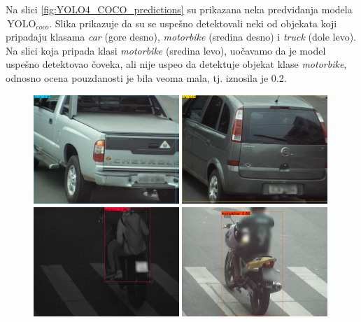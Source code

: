 \documentclass[12pt,oneside]{memoir}
\newcommand{\yolo}{\ensuremath{\,\textrm{YOLO}}}
\begin{document}
Na slici \ref{fig:YOLO4_COCO_predictions} su prikazana neka predviđanja modela $\yolo_{coco}$. Slika prikazuje da su se uspešno detektovali neki od objekata koji pripadaju klasama \textit{car} (gore desno), \textit{motorbike} (sredina desno) i \textit{truck} (dole levo). Na slici koja pripada klasi \textit{motorbike} (sredina levo), uočavamo da je model uspešno detektovao čoveka, ali nije uspeo da detektuje objekat klase \textit{motorbike}, odnosno ocena pouzdanosti je bila veoma mala, tj. iznosila je 0.2. 



\begin{figure}[htbp]
    \centering
      \includegraphics[width=0.49\textwidth]{matfmaster/yolo/v4/base/car_0.jpg}
      \includegraphics[width=0.49\textwidth]{matfmaster/yolo/v4/base/car_1.jpg}
      \includegraphics[width=0.49\textwidth]{matfmaster/yolo/v4/base/motorbike_0.jpg}
      \includegraphics[width=0.49\textwidth]{matfmaster/yolo/v4/base/motorbike_1.jpg}

\end{figure}
\end{document}
